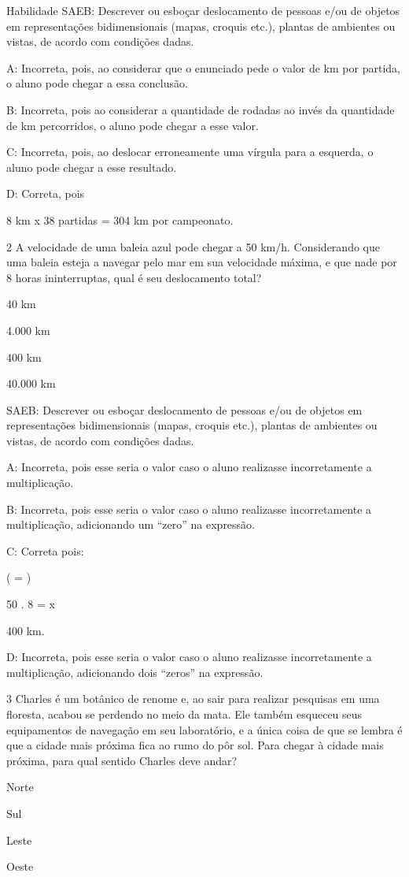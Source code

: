{Habilidade SAEB: Descrever ou esboçar deslocamento de pessoas e/ou de
objetos em representações bidimensionais (mapas, croquis etc.), plantas
de ambientes ou vistas, de acordo com condições dadas.

A: Incorreta, pois, ao considerar que o enunciado pede o valor de km por
partida, o aluno pode chegar a essa conclusão.

B: Incorreta, pois ao considerar a quantidade de rodadas ao invés da
quantidade de km percorridos, o aluno pode chegar a esse valor.

C: Incorreta, pois, ao deslocar erroneamente uma vírgula para a
esquerda, o aluno pode chegar a esse resultado.

D: Correta, pois

8 km x 38 partidas = 304 km por campeonato.

\num{2} A velocidade de uma baleia azul pode chegar a 50 km/h. Considerando
que uma baleia esteja a navegar pelo mar em sua velocidade máxima, e que
nade por 8 horas ininterruptas, qual é seu deslocamento total?
\item 40 km
\item 4.000 km
\item 400 km
\item 40.000 km

SAEB: Descrever ou esboçar deslocamento de pessoas e/ou de objetos em
representações bidimensionais (mapas, croquis etc.), plantas de
ambientes ou vistas, de acordo com condições dadas.

A: Incorreta, pois esse seria o valor caso o aluno realizasse
incorretamente a multiplicação.

B: Incorreta, pois esse seria o valor caso o aluno realizasse
incorretamente a multiplicação, adicionando um ``zero'' na expressão.

C: Correta pois:

( = )

50 . 8 = x

400 km.

D: Incorreta, pois esse seria o valor caso o aluno realizasse
incorretamente a multiplicação, adicionando dois ``zeros'' na expressão.

\num{3} Charles é um botânico de renome e, ao sair para realizar pesquisas em
uma floresta, acabou se perdendo no meio da mata. Ele também esqueceu
seus equipamentos de navegação em seu laboratório, e a única coisa de
que se lembra é que a cidade mais próxima fica ao rumo do pôr sol. Para
chegar à cidade mais próxima, para qual sentido Charles deve andar?
\item Norte
\item Sul
\item Leste
\item Oeste

}

